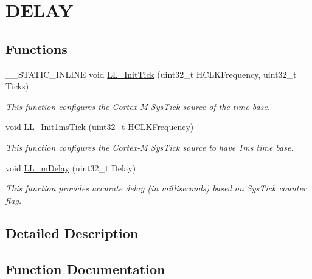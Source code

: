 \hypertarget{group___u_t_i_l_s___l_l___e_f___d_e_l_a_y}{}\section{D\+E\+L\+AY}
\label{group___u_t_i_l_s___l_l___e_f___d_e_l_a_y}
\subsection*{Functions}
\begin{DoxyCompactItemize}
\item 
\+\_\+\+\_\+\+S\+T\+A\+T\+I\+C\+\_\+\+I\+N\+L\+I\+NE void \hyperlink{group___u_t_i_l_s___l_l___e_f___d_e_l_a_y_ga170d1d651b46544daf571fb6b4e3b850}{L\+L\+\_\+\+Init\+Tick} (uint32\+\_\+t H\+C\+L\+K\+Frequency, uint32\+\_\+t Ticks)
\begin{DoxyCompactList}\small\item\em This function configures the Cortex-\/M Sys\+Tick source of the time base. \end{DoxyCompactList}\item 
void \hyperlink{group___u_t_i_l_s___l_l___e_f___d_e_l_a_y_ga485805c708e3aa0820454523782d4de4}{L\+L\+\_\+\+Init1ms\+Tick} (uint32\+\_\+t H\+C\+L\+K\+Frequency)
\begin{DoxyCompactList}\small\item\em This function configures the Cortex-\/M Sys\+Tick source to have 1ms time base. \end{DoxyCompactList}\item 
void \hyperlink{group___u_t_i_l_s___l_l___e_f___d_e_l_a_y_ga7b7ca6d9cbec320c3e9f326b203807aa}{L\+L\+\_\+m\+Delay} (uint32\+\_\+t Delay)
\begin{DoxyCompactList}\small\item\em This function provides accurate delay (in milliseconds) based on Sys\+Tick counter flag. \end{DoxyCompactList}\end{DoxyCompactItemize}


\subsection{Detailed Description}


\subsection{Function Documentation}
\mbox{\label{group___u_t_i_l_s___l_l___e_f___d_e_l_a_y_ga485805c708e3aa0820454523782d4de4}} 
